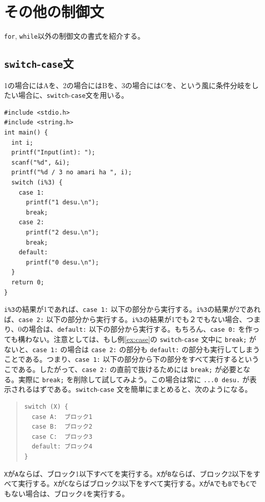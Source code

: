 \section{その他の制御文}
 {\tt for}, {\tt while}以外の制御文の書式を紹介する。

\subsection{{\tt switch}-{\tt case}文}
1の場合にはAを、2の場合にはBを、3の場合にはCを、という風に条件分岐をしたい場合に、\verb|switch|-\verb|case|文を用いる。
%
\begin{reidai}\label{ex:case}
\begin{verbatim}
#include <stdio.h>
#include <string.h>
int main() {
  int i;
  printf("Input(int): ");
  scanf("%d", &i);
  printf("%d / 3 no amari ha ", i);
  switch (i%3) {
    case 1:
      printf("1 desu.\n");
      break;
    case 2:
      printf("2 desu.\n");
      break;
    default:
      printf("0 desu.\n");
  }
  return 0;
}
\end{verbatim}
\end{reidai} \noindent
%
\verb|i%3|の結果が1であれば、\verb|case 1:| 以下の部分から実行する。\verb|i%3|の結果が2であれば、\verb|case 2:| 以下の部分から実行する。\verb|i%3|の結果が1でも２でもない場合、つまり、0の場合は、\verb|default:| 以下の部分から実行する。もちろん、\verb|case 0:| を作っても構わない。注意としては、もし例\ref{ex:case}の \verb|switch|-\verb|case| 文中に \verb|break;| がないと、\verb|case 1:| の場合は \verb|case 2:| の部分も \verb|default:| の部分も実行してしまうことである。つまり、\verb|case 1:| 以下の部分から下の部分をすべて実行するというこである。したがって、\verb|case 2:| の直前で抜けるためには \verb|break;| が必要となる。実際に \verb|break;| を削除して試してみよう。この場合は常に \verb|...0 desu.| が表示されるはずである。\verb|switch|-\verb|case| 文を簡単にまとめると、次のようになる。
%
\begin{quote}
\begin{verbatim}
switch (X) {
  case A:  ブロック1
  case B:  ブロック2
  case C:  ブロック3
  default: ブロック4
}
\end{verbatim}
\end{quote}
%
\verb|X|が\verb|A|ならば、ブロック1以下すべてを実行する。\verb|X|が\verb|B|ならば、ブロック2以下をすべて実行する。\verb|X|が\verb|C|ならばブロック3以下をすべて実行する。\verb|X|が\verb|A|でも\verb|B|でも\verb|C|でもない場合は、ブロック4を実行する。


